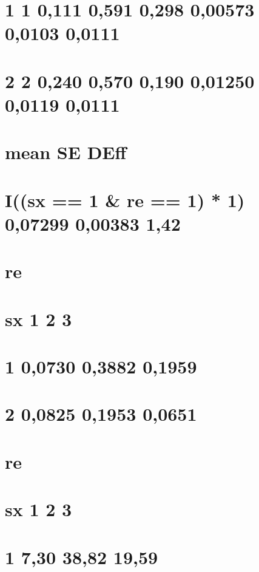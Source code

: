 \documentclass[]{book}
\theoremstyle{definition}
\theoremstyle{definition}
\theoremstyle{definition}
\theoremstyle{remark}
\begin{document}
\section{1 1 0,111 0,591 0,298 0,00573 0,0103 0,0111}\label{section-44}

\section{2 2 0,240 0,570 0,190 0,01250 0,0119 0,0111}\label{section-45}

\section{mean SE DEff}\label{mean-se-deff-1}

\section{I((sx == 1 \& re == 1) * 1) 0,07299 0,00383
1,42}\label{isx-1-re-1-1-007299-000383-142}

\section{re}\label{re-1}

\section{sx 1 2 3}\label{sx-1-2-3-1}

\section{1 0,0730 0,3882 0,1959}\label{section-46}

\section{2 0,0825 0,1953 0,0651}\label{section-47}

\section{re}\label{re-2}

\section{sx 1 2 3}\label{sx-1-2-3-2}

\section{1 7,30 38,82 19,59}\label{section-48}
\end{document}
